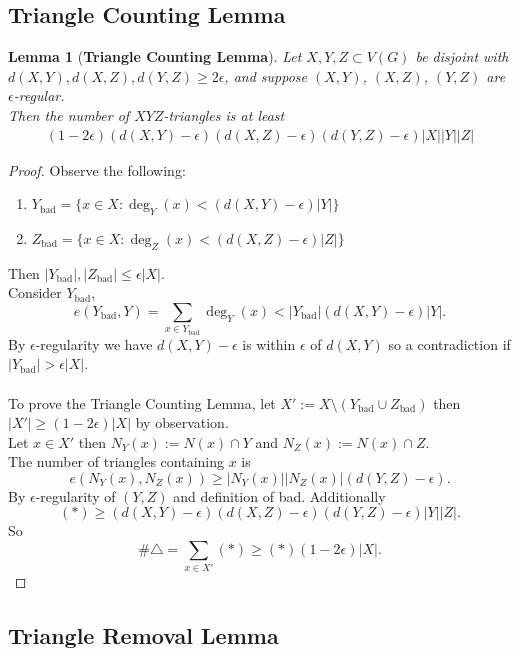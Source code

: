 \documentclass[a4paper]{article}
\newtheorem{lem}[thm]{Lemma}
\begin{document}
\subsection{Triangle Counting Lemma}
\begin{lem}[\textbf{Triangle Counting Lemma}]
    Let $X,Y,Z\subset V(G)$ be disjoint with $d(X,Y), d(X,Z), d(Y,Z)\geq 2\epsilon$, and suppose $(X,Y)$, $(X,Z)$, $(Y,Z)$ are $\epsilon$-regular. \\
    Then the number of $XYZ$-triangles is at least
    \begin{align*}
        (1-2\epsilon)(d(X,Y)-\epsilon)(d(X,Z)-\epsilon)(d(Y,Z)-\epsilon)|X||Y||Z|
    \end{align*}
\end{lem}
\begin{proof}
    Observe the following: \begin{enumerate}
        \item $Y_{\text{bad}}= \{x\in X: \deg_Y(x)<(d(X,Y)-\epsilon)|Y|\}$
        \item $Z_{\text{bad}}= \{x\in X: \deg_Z(x)<(d(X,Z)-\epsilon)|Z|\}$
    \end{enumerate}
    Then $|Y_{\text{bad}}|,|Z_{\text{bad}}|\leq \epsilon |X|$.\\
    Consider $Y_{\text{bad}}$, \[
        e(Y_{\text{bad}},Y)= \sum_{x\in Y_{ \text{bad}}}\deg_Y(x)<|Y_{ \text{bad}}|(d(X,Y)-\epsilon)|Y|
    .\] 
    By $\epsilon$-regularity we have $d(X,Y)-\epsilon$ is within $\epsilon$ of $d(X,Y)$ so a contradiction if $|Y_{\text{bad}}|>\epsilon |X|$.\\\\
    To prove the Triangle Counting Lemma, let $X':=X\setminus(Y_{\text{bad}}\cup Z_{\text{bad}})$ then $|X'|\geq (1-2\epsilon)|X|$ by observation. \\
    Let $x\in X'$ then $N_Y(x):=N(x)\cap Y$ and $N_Z(x):=N(x)\cap Z$. \\
    The number of triangles containing $x$ is 
    \[
        e(N_Y(x),N_Z(x))\geq |N_Y(x)||N_Z(x)|(d(Y,Z)-\epsilon) \tag{$*$}
    .\]
    By $\epsilon$-regularity of $(Y,Z)$ and definition of bad. 
    Additionally \[
    (*)\geq (d(X,Y)-\epsilon)(d(X,Z)-\epsilon)(d(Y,Z)-\epsilon)|Y||Z|
    .\] 
    So \[
    \# \triangle = \sum_{x\in X'}(*)\geq (*)(1-2\epsilon)|X|
    .\]
\end{proof}

\subsection{Triangle Removal Lemma}
\end{document}
